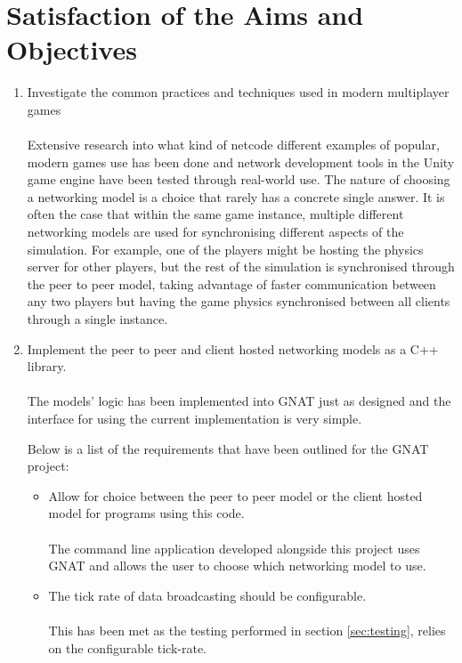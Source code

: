 \section{Satisfaction of the Aims and Objectives}
\begin{enumerate}
\item Investigate the common practices and techniques used in modern multiplayer games
  \\\\
  Extensive research into what kind of netcode different examples of popular, modern games use has been done and network development tools in the Unity game engine have been tested through real-world use. The nature of choosing a networking model is a choice that rarely has a concrete single answer. It is often the case that within the same game instance, multiple different networking models are used for synchronising different aspects of the simulation. For example, one of the players might be hosting the physics server for other players, but the rest of the simulation is synchronised through the peer to peer model, taking advantage of faster communication between any two players but having the game physics synchronised between all clients through a single instance.


\item Implement the peer to peer and client hosted networking models as a C++ library.
  \\\\
  The models' logic has been implemented into GNAT just as designed and the interface for using the current implementation is very simple.

  Below is a list of the requirements that have been outlined for the GNAT project:

  \begin{itemize}
  \item Allow for choice between the peer to peer model or the client hosted model for programs using this code.
    \\\\
    The command line application developed alongside this project uses GNAT and allows the user to choose which networking model to use.


  \item The tick rate of data broadcasting should be configurable.
    \\\\
    This has been met as the testing performed in section \ref{sec:testing}, relies on the configurable tick-rate.



\end{itemize}
\end{enumerate}
